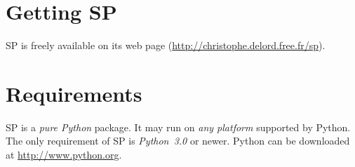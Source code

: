 %
%
%

\section{Getting SP}

SP is freely available on its web page (\url{http://christophe.delord.free.fr/sp}).

\section{Requirements}

SP is a \emph{pure Python} package.
It may run on \emph{any platform} supported by Python.
The only requirement of SP is \emph{Python~3.0} or newer. Python can be downloaded at \url{http://www.python.org}.
